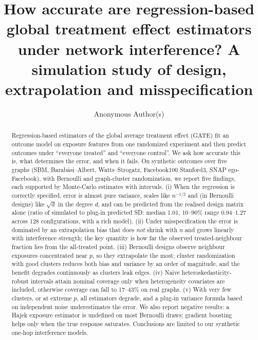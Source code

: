 \documentclass{article}
\title{How accurate are regression-based global treatment effect estimators under network interference? A simulation study of design, extrapolation and misspecification}
\author{Anonymous Author(s)}
\begin{document}
\maketitle
\begin{abstract}
Regression-based estimators of the global average treatment effect (GATE) fit an outcome model on exposure features from one randomized experiment and then predict outcomes under ``everyone treated'' and ``everyone control''. We ask how accurate this is, what determines the error, and when it fails. On synthetic outcomes over five graphs (SBM, Barab\'asi--Albert, Watts--Strogatz, Facebook100 Stanford3, SNAP ego-Facebook), with Bernoulli and graph-cluster randomization, we report five findings, each supported by Monte-Carlo estimates with intervals. (i) When the regression is correctly specified, error is almost pure variance, scales like $n^{-1/2}$ and (in Bernoulli designs) like $\sqrt{d}$ in the degree $d$, and can be predicted from the realised design matrix alone (ratio of simulated to plug-in predicted SD: median 1.01, 10--90\% range 0.94--1.27 across 128 configurations, with a rich model). (ii) Under misspecification the error is dominated by an extrapolation bias that does \emph{not} shrink with $n$ and grows linearly with interference strength; the key quantity is how far the observed treated-neighbour fraction lies from the all-treated point. (iii) Bernoulli designs observe neighbour exposures concentrated near $p$, so they extrapolate the most; cluster randomization with good clusters reduces both bias and variance by an order of magnitude, and the benefit degrades continuously as clusters leak edges. (iv) Naive heteroskedasticity-robust intervals attain nominal coverage only when heterogeneity covariates are included, otherwise coverage can fall to 17--43\% on real graphs. (v) With very few clusters, or at extreme $p$, all estimators degrade, and a plug-in variance formula based on independent noise underestimates the error. We also report negative results: a Hajek exposure estimator is undefined on most Bernoulli draws; gradient boosting helps only when the true response saturates. Conclusions are limited to our synthetic one-hop interference models.
\end{abstract}
\end{document}
